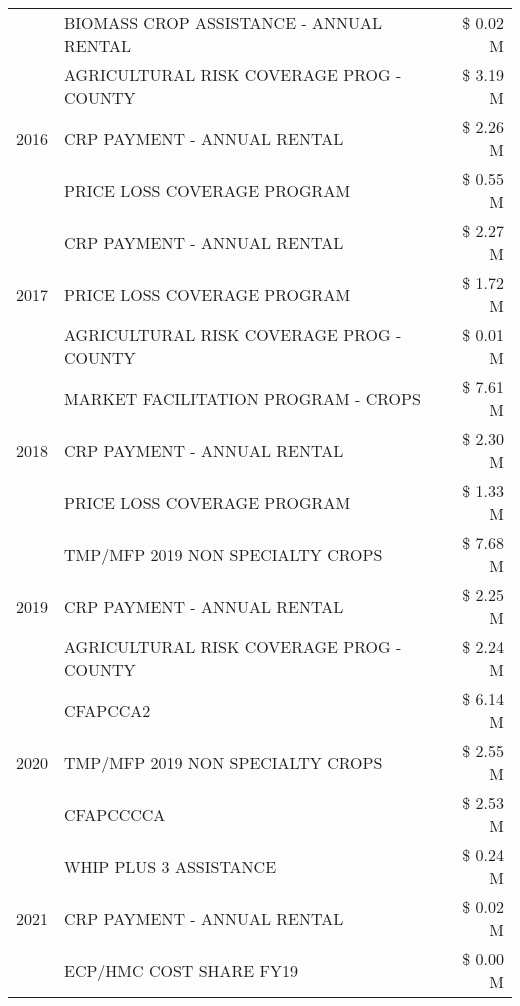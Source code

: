 \begin{tabular}{llr}
 & BIOMASS CROP ASSISTANCE - ANNUAL RENTAL & \$ 0.02 M \\
\cline{1-3}
\multirow[t]{3}{*}{2016} & AGRICULTURAL RISK COVERAGE PROG - COUNTY & \$ 3.19 M \\
 & CRP PAYMENT - ANNUAL RENTAL & \$ 2.26 M \\
 & PRICE LOSS COVERAGE PROGRAM & \$ 0.55 M \\
\cline{1-3}
\multirow[t]{3}{*}{2017} & CRP PAYMENT - ANNUAL RENTAL & \$ 2.27 M \\
 & PRICE LOSS COVERAGE PROGRAM & \$ 1.72 M \\
 & AGRICULTURAL RISK COVERAGE PROG - COUNTY & \$ 0.01 M \\
\cline{1-3}
\multirow[t]{3}{*}{2018} & MARKET FACILITATION PROGRAM - CROPS & \$ 7.61 M \\
 & CRP PAYMENT - ANNUAL RENTAL & \$ 2.30 M \\
 & PRICE LOSS COVERAGE PROGRAM & \$ 1.33 M \\
\cline{1-3}
\multirow[t]{3}{*}{2019} & TMP/MFP 2019 NON SPECIALTY CROPS & \$ 7.68 M \\
 & CRP PAYMENT - ANNUAL RENTAL & \$ 2.25 M \\
 & AGRICULTURAL RISK COVERAGE PROG - COUNTY & \$ 2.24 M \\
\cline{1-3}
\multirow[t]{3}{*}{2020} & CFAPCCA2 & \$ 6.14 M \\
 & TMP/MFP 2019 NON SPECIALTY CROPS & \$ 2.55 M \\
 & CFAPCCCCA & \$ 2.53 M \\
\cline{1-3}
\multirow[t]{3}{*}{2021} & WHIP PLUS 3 ASSISTANCE & \$ 0.24 M \\
 & CRP PAYMENT - ANNUAL RENTAL & \$ 0.02 M \\
 & ECP/HMC COST SHARE FY19 & \$ 0.00 M \\
\cline{1-3}
\bottomrule
\end{tabular}
